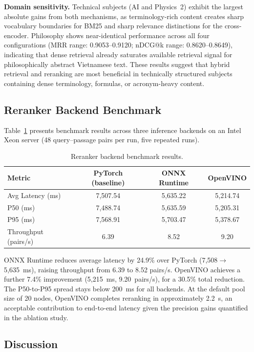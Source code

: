 \documentclass[runningheads]{llncs}
\begin{document}
\noindent\textbf{Domain sensitivity.} Technical subjects (AI and Physics~2) exhibit the largest absolute gains from both mechanisms, as terminology-rich content creates sharp vocabulary boundaries for BM25 and sharp relevance distinctions for the cross-encoder. Philosophy shows near-identical performance across all four configurations (MRR range: 0.9053--0.9120; nDCG@k range: 0.8620--0.8649), indicating that dense retrieval already saturates available retrieval signal for philosophically abstract Vietnamese text. These results suggest that hybrid retrieval and reranking are most beneficial in technically structured subjects containing dense terminology, formulas, or acronym-heavy content.
\FloatBarrier
\subsection{Reranker Backend Benchmark}
\label{sec:backend}

Table~\ref{tab:backend} presents benchmark results across three inference backends on an Intel Xeon server (48 query--passage pairs per run, five repeated runs).

\begin{table}[ht]
\caption{Reranker backend benchmark results.}
\label{tab:backend}
\centering
\begin{tabular}{|l|c|c|c|}
\hline
Metric & PyTorch (baseline) & ONNX Runtime & OpenVINO \\
\hline
Avg Latency (ms)    & 7,507.54 & 5,635.22 & 5,214.74 \\
P50 (ms)            & 7,488.74 & 5,635.59 & 5,205.31 \\
P95 (ms)            & 7,568.91 & 5,703.47 & 5,378.67 \\
Throughput (pairs/s)& 6.39     & 8.52     & 9.20     \\
\hline
\end{tabular}
\end{table}


ONNX Runtime reduces average latency by 24.9\% over PyTorch (7,508$\to$5,635~ms), raising throughput from 6.39 to 8.52 pairs/s. OpenVINO achieves a further 7.4\% improvement (5,215~ms, 9.20~pairs/s), for a 30.5\% total reduction. The P50-to-P95 spread stays below 200~ms for all backends. At the default pool size of 20 nodes, OpenVINO completes reranking in approximately 2.2~s, an acceptable contribution to end-to-end latency given the precision gains quantified in the ablation study.
\FloatBarrier
\subsection{Discussion}
\end{document}
